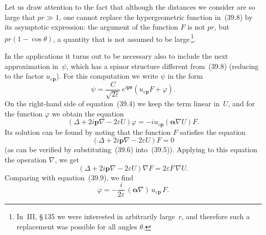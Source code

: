 Let us draw attention to the fact that although the distances we consider are so large that $pr \gg 1$, one cannot replace the hypergeometric function in~(39.8) by its asymptotic expression: the argument of the function $F$ is not $pr$, but $pr(1-\cos\theta)$, a quantity that is not assumed to be large\,\footnote{In~III, \S\,135 we were interested in arbitrarily large~$r$, and therefore such a replacement was possible for all angles $\theta$.}.

In the applications it turns out to be necessary also to include the next approximation in~$\psi$, which has a spinor structure different from~(39.8) (reducing to the factor $u_{\varepsilon\mathbf{p}}$). For this computation we write $\psi$ in the form
\[
\psi = \frac{C}{\sqrt{2\varepsilon}}\,e^{i\mathbf{p}\mathbf{r}}(u_{\varepsilon\mathbf{p}}F + \varphi).
\]
On the right-hand side of equation~(39.4) we keep the term linear in~$U$, and for the function $\varphi$ we obtain the equation
\begin{equation}
(\Delta + 2i\mathbf{p}\nabla - 2\varepsilon U)\varphi = -iu_{\varepsilon\mathbf{p}}(\boldsymbol{\alpha}\nabla U)F.
\tag{39.9}
\end{equation}
Its solution can be found by noting that the function $F$ satisfies the equation
\[
(\Delta + 2i\mathbf{p}\nabla - 2\varepsilon U)F = 0
\]
(as can be verified by substituting~(39.6) into~(39.5)). Applying to this equation the operation $\nabla$, we get
\[
(\Delta + 2i\mathbf{p}\nabla - 2\varepsilon U)\nabla F = 2\varepsilon F\,\nabla U.
\]
Comparing with equation~(39.9), we find
\[
\varphi = -\frac{i}{2\varepsilon}\,(\boldsymbol{\alpha}\nabla)\,u_{\varepsilon\mathbf{p}}\,F.
\]

